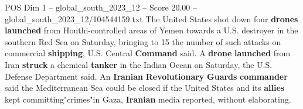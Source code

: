 \begin{textsample}{POS Dim 1 – global\_south\_2023\_12 – Score 20.00 – global\_south\_2023\_12/104544159.txt}
The United States shot down four \textbf{drones} \textbf{launched} from Houthi-controlled areas of Yemen towards a U.S. destroyer in the southern Red Sea on Saturday, bringing to 15 the number of such attacks on commercial \textbf{shipping}, U.S.
Central \textbf{Command} said.
A \textbf{drone} \textbf{launched} from Iran \textbf{struck} a chemical \textbf{tanker} in the Indian Ocean on Saturday, the U.S.
Defense Department said.
An \textbf{Iranian} \textbf{Revolutionary} \textbf{Guards} \textbf{commander} said the Mediterranean Sea could be closed if the United States and its \textbf{allies} kept committing"crimes"in Gaza, \textbf{Iranian} media reported, without elaborating.

\end{textsample}
